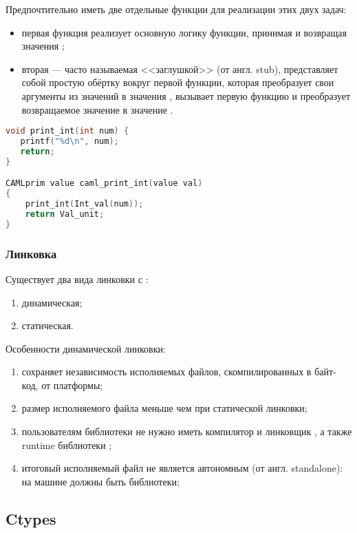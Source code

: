 Предпочтительно иметь две отдельные функции \C{} для реализации этих двух задач:

\begin{itemize}
	\item первая функция реализует основную логику функции, принимая и возвращая значения \C{};
	\item вторая --- часто называемая <<заглушкой>> (от англ. stub), представляет собой простую обёртку вокруг первой функции, которая преобразует свои аргументы из значений \OCaml{} в значения \C{}, вызывает первую функцию и преобразует возвращаемое значение \C{} в значение \OCaml{}.
\end{itemize}

\begin{lstlisting}[caption={Функция <<print\_int>> --- реализует логику, функция <<caml\_print\_int>> --- заглушка}, language=C, frame=single, label={qwe}]
void print_int(int num) {
   printf("%d\n", num);
   return;
}

CAMLprim value caml_print_int(value val)
{
    print_int(Int_val(num));
    return Val_unit;
}
\end{lstlisting}

\subsubsection{Линковка}

Существует два вида линковки \OCaml{} с \C{}:

\begin{enumerate}
	\item динамическая;
	\item статическая.
\end{enumerate}

Особенности динамической линковки:
\begin{enumerate}
	\item сохраняет независимость исполняемых файлов, скомпилированных в байт-код, от платформы;
	\item размер исполняемого файла меньше чем при статической линковки;
	\item пользователям библиотеки не нужно иметь компилятор и линковщик \C{}, а также runtime библиотеки \C{};
	\item итоговый исполняемый файл не является автономным (от англ. standalone): на машине должны быть библиотеки;
\end{enumerate}

\subsection{Ctypes}
\label{sec:ctypes}

